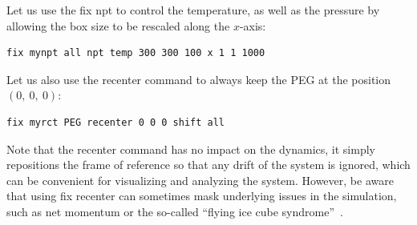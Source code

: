 \documentclass[9pt,tutorial]{livecoms}
\newcommand{\lmpcmd}[1]{\hspace{0pt}\colorbox{listing}{\textcolor{command}{\small{#1}}}\hspace{0pt}} %
\begin{document}
Let us use the \lmpcmd{fix npt} to control the temperature, as
well as the pressure by allowing the box size to be rescaled along the $x$-axis:
\begin{lstlisting}
fix mynpt all npt temp 300 300 100 x 1 1 1000
\end{lstlisting}
Let us also use the \lmpcmd{recenter} command to always keep the PEG at
the position $(0,~0,~0)$:
\begin{lstlisting}
fix myrct PEG recenter 0 0 0 shift all
\end{lstlisting}

\begin{note}
    {\color{blue}
    Note that the \lmpcmd{recenter} command has no impact on the dynamics,
    it simply repositions the frame of reference so that any drift of the
    system is ignored, which can be convenient for visualizing and analyzing
    the system. However, be aware that using \lmpcmd{fix recenter} can sometimes
    mask underlying issues in the simulation, such as net momentum or the so-called
    ``flying ice cube syndrome''~\cite{wong2016good}.}
\end{note}
\end{document}
